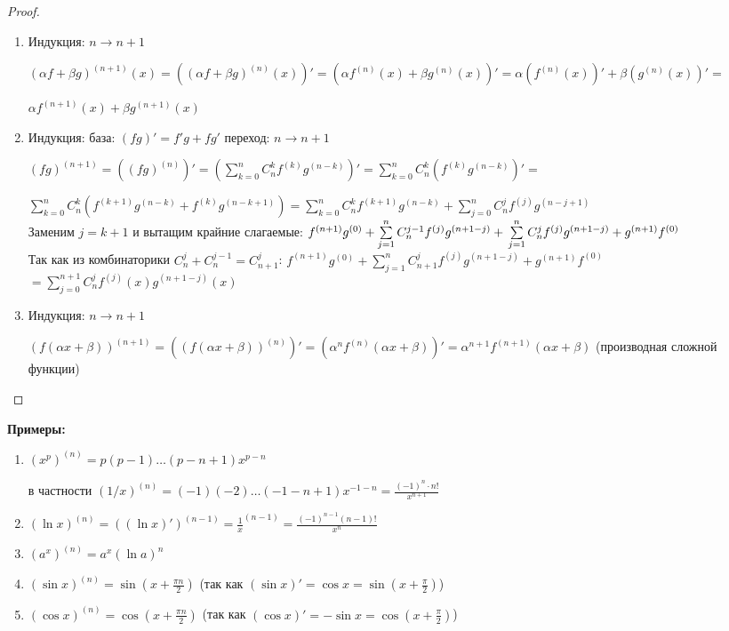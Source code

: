 \begin{proof}
    \
    \begin{enumerate}
        \item Индукция: $n \longrightarrow n+1$
        
        $(\alpha f + \beta g)^{(n+1)}(x) = ((\alpha f + \beta g)^{(n)} (x))' = 
        (\alpha f^{(n)}(x) + \beta g^{(n)}(x))' = \alpha (f^{(n)}(x))' + \beta (g^{(n)}(x))' =$
        
        $\alpha f^{(n+1)}(x) + \beta g^{(n+1)}(x)$

        \item Индукция: база: $(fg)' = f'g + fg'$ \quad переход: $n \longrightarrow n+1$
        
        $(fg)^{(n+1)} = ((fg)^{(n)})' = (\sum\limits_{k=0}^{n} C_n^k f^{(k)} g^{(n-k)})' = 
        \sum\limits_{k=0}^{n} C_n^k (f^{(k)} g^{(n-k)})' =$ 
        
        $\sum\limits_{k=0}^{n} C_n^k (f^{(k + 1)} g^{(n-k)} + f^{(k)} g^{(n-k+1)}) =
        \sum\limits_{k=0}^{n} C_n^k f^{(k+1)} g^{(n-k)} + \sum\limits_{j=0}^{n} C_n^j f^{(j)} g^{(n-j+1)}$\\
        Заменим $j= k+1$ и вытащим крайние слагаемые: $f^{(n+1)}g^{(0)} + \sum\limits_{j=1}^{n} C_n^{j-1} f^{(j)} g^{(n+1-j)} + \\
        \sum\limits_{j=1}^{n} C_n^j f^{(j)} g^{(n+1-j)} + g^{(n+1)}f^{(0)}$\\
        Так как из комбинаторики $C_n^j + C_n^{j-1} = C_{n+1}^j$: $f^{(n+1)}g^{(0)} + \sum\limits_{j=1}^{n} C_{n+1}^j f^{(j)} g^{(n+1-j)} + g^{(n+1)}f^{(0)}$\\
        $= \sum\limits_{j=0}^{n+1} C_n^j f^{(j)}(x) g^{(n+1-j)} (x)$

        \item Индукция: $n \longrightarrow n+1$
        
        $(f(\alpha x + \beta))^{(n+1)} = ((f(\alpha x + \beta))^{(n)})' = (\alpha^n f^{(n)}(\alpha x + \beta))' = 
        \alpha^{n+1} f^{(n+1)}(\alpha x + \beta)$ (производная сложной функции)

    \end{enumerate}
\end{proof}

\textbf{Примеры:}

\begin{enumerate}
    \item $(x^p)^{(n)} = p(p-1) \dots (p-n+1) x^{p-n}$
    
    в частности $(1/x)^{(n)} = (-1)(-2) \dots (-1-n+1) x^{-1-n} = \frac{(-1)^n \cdot n!}{x^{n+1}}$

    \item $(\ln x)^{(n)} = ((\ln x)')^{(n-1)} = \frac{1}{x}^{(n-1)} = \frac{(-1)^{n-1} (n-1)!}{x^n}$
    \item $(a^x)^{(n)} = a^x (\ln a)^n$
    \item $(\sin x)^{(n)} = \sin(x + \frac{\pi n}{2})$ (так как $(\sin x)' = \cos x = \sin (x + \frac{\pi}{2})$)
    \item $(\cos x)^{(n)} = \cos(x + \frac{\pi n}{2})$ (так как $(\cos x)' = -\sin x = \cos (x + \frac{\pi}{2})$)
\end{enumerate}